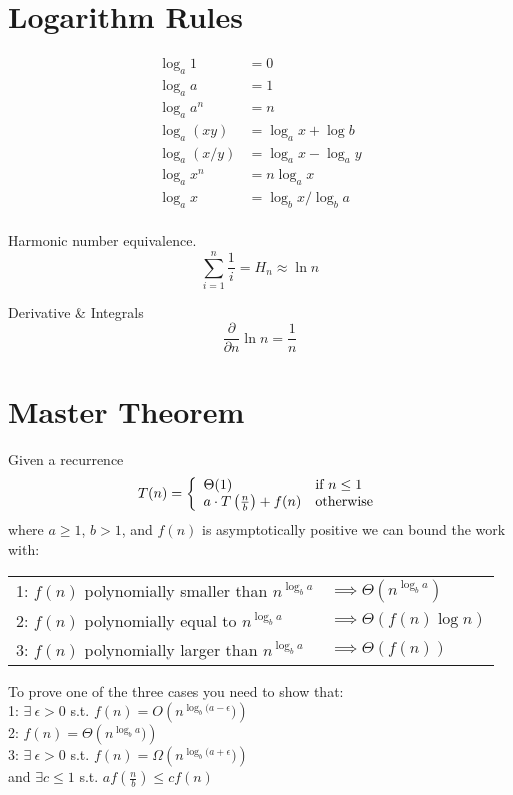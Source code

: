\documentclass[10pt]{article}
\begin{document}
\section{Logarithm Rules}

\begin{align*}
  \log_a 1 &= 0 \\
  \log_a a &= 1 \\
  \log_a a^n &= n \\
  \log_a (xy) &= \log_a x + \log b \\
  \log_a (x / y) &= \log_a x - \log_a y \\
  \log_a x^n &= n \log_a x \\
  \log_a x &= \log_b x / \log_b a \\
\end{align*}

Harmonic number equivalence.
$$
\sum_{i = 1}^n \frac{1}{i} = H_n \approx \ln n
$$

Derivative \& Integrals
$$
\frac{\partial}{\partial n} \ln n = \frac{1}{n}
$$

\section{Master Theorem}
Given a recurrence 
$$T(n) = \left\{
  \begin{array}{l l}
    \Theta(1) & \text{if }n \leq 1 \\
    a\cdot T\left(\frac{n}{b}\right) + f(n) & \text{otherwise} \\
  \end{array}\right.$$
where
$a \geq 1$, $b > 1$, and $f(n)$ is asymptotically positive we can bound
the work with:


\begin{tabular}{l l}
1: $f(n)$ polynomially smaller than $n^{\log_b a}$ & $\implies \Theta(n^{\log_b a})$\\
2: $f(n)$ polynomially equal to $n^{\log_b a}$ & $\implies \Theta(f(n) \log n)$\\
3: $f(n)$ polynomially larger than $n^{\log_b a}$ & $\implies \Theta(f(n))$\\
\end{tabular}

To prove one of the three cases you need to show that: \\
1: $\exists \ \epsilon > 0$ s.t. $f(n) = O\left( n^{\log_b(a - \epsilon})\right)$ \\
2: $f(n) = \Theta\left( n^{\log_b a})\right)$ \\
3: $\exists \ \epsilon > 0$ s.t. $f(n) = \Omega\left( n^{\log_b(a + \epsilon})\right)$\\
and $\exists c \leq 1$ s.t. $af\left(\frac{n}{b}\right) \leq cf(n)$
\end{document}
